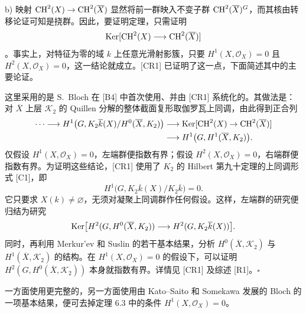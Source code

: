\noindent b) 映射 $\operatorname{CH}^2(X)\to\operatorname{CH}^2(\overline X)$ 显然将前一群映入不变子群 $\operatorname{CH}^2(\overline X)^G$，而其核由转移论证可知是挠群。因此，要证明定理，只需证明
\[
 \operatorname{Ker}[\operatorname{CH}^2(X)\longrightarrow\operatorname{CH}^2(\overline X)]
\]
。事实上，对特征为零的域 $k$ 上任意光滑射影簇，只要 $H^1(X,\mathcal O_X)=0$ 且 $H^2(X,\mathcal O_X)=0$，这一结论就成立。[CR1] 已证明了这一点，下面简述其中的主要论证。

这里采用的是 S.~Bloch 在 [B4] 中首次使用、并由 [CR1] 系统化的。其做法是：对 $\overline X$ 上层 $\mathcal K_2$ 的 Quillen 分解的整体截面复形取伽罗瓦上同调，由此得到正合列
\[
\begin{split}
\cdots\longrightarrow
 H^1\bigl(G,K_2\overline k(X)/H^0(\overline X,K_2)\bigr)
 &\longrightarrow\operatorname{Ker}[\operatorname{CH}^2(X)\to\operatorname{CH}^2(\overline X)]\\
 &\longrightarrow H^1\bigl(G,H^1(\overline X,K_2)\bigr).
\end{split}
\]
仅假设 $H^1(X,\mathcal O_X)=0$，左端群便指数有界；假设 $H^2(X,\mathcal O_X)=0$，右端群便指数有界。为证明这些结论，[CR1] 使用了 $K_2$ 的 Hilbert 第九十定理的上同调形式 [C1]，即
\[
 H^1\bigl(G,K_2\overline k(X)/K_2\overline k\bigr)=0.
\]
它只要求 $X(k)\ne\varnothing$，无须对凝聚上同调群作任何假设。这样，左端群的研究便归结为研究
\[
 \operatorname{Ker}\bigl[H^2(G,H^0(\overline X,K_2))
       \longrightarrow H^2(G,K_2\overline k(X))\bigr].
\]
同时，再利用 Merkur'ev 和 Suslin 的若干基本结果，分析 $H^0(\overline X,\mathcal K_2)$ 与 $H^1(\overline X,\mathcal K_2)$ 的结构。在 $H^1(X,\mathcal O_X)=0$ 的假设下，可以证明 $H^2(G,H^0(\overline X,\mathcal K_2))$ 本身就指数有界。详情见 [CR1] 及综述 [R1]。\hfill$\square$

一方面使用更完整的，另一方面使用由 Kato--Saito 和 Somekawa 发展的 Bloch 的一项基本结果，便可去掉定理 6.3 中的条件 $H^1(X,\mathcal O_X)=0$。

